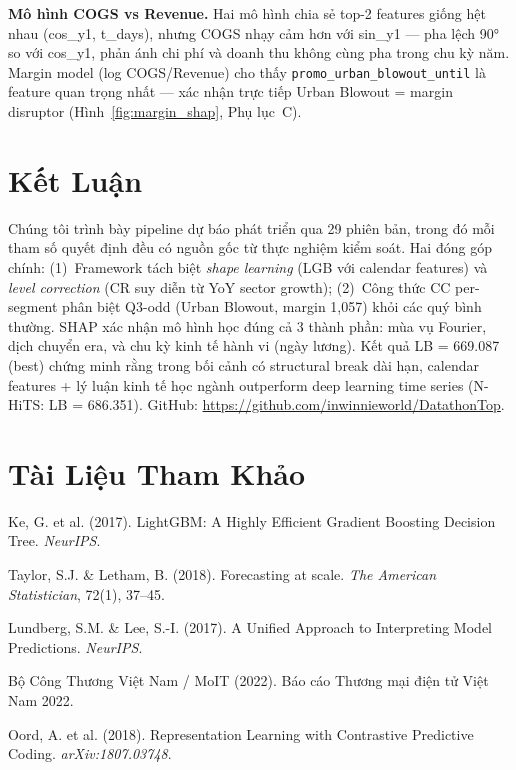 \documentclass{article}
\begin{document}
\textbf{Mô hình COGS vs Revenue.} Hai mô hình chia sẻ top-2 features giống hệt nhau (cos\_y1, t\_days), nhưng COGS nhạy cảm hơn với sin\_y1 — pha lệch 90° so với cos\_y1, phản ánh chi phí và doanh thu không cùng pha trong chu kỳ năm. Margin model (log COGS/Revenue) cho thấy \texttt{promo\_urban\_blowout\_until} là feature quan trọng nhất — xác nhận trực tiếp Urban Blowout = margin disruptor (Hình~\ref{fig:margin_shap}, Phụ lục~C).

\section{Kết Luận}

Chúng tôi trình bày pipeline dự báo phát triển qua 29 phiên bản, trong đó mỗi tham số quyết định đều có nguồn gốc từ thực nghiệm kiểm soát. Hai đóng góp chính: (1)~Framework tách biệt \textit{shape learning} (LGB với calendar features) và \textit{level correction} (CR suy diễn từ YoY sector growth); (2)~Công thức CC per-segment phân biệt Q3-odd (Urban Blowout, margin 1,057) khỏi các quý bình thường. SHAP xác nhận mô hình học đúng cả 3 thành phần: mùa vụ Fourier, dịch chuyển era, và chu kỳ kinh tế hành vi (ngày lương). Kết quả LB = 669.087 (best) chứng minh rằng trong bối cảnh có structural break dài hạn, calendar features + lý luận kinh tế học ngành outperform deep learning time series (N-HiTS: LB = 686.351). GitHub: \url{https://github.com/inwinnieworld/DatathonTop}.

\section*{Tài Liệu Tham Khảo}
\small
\begin{enumerate}[label={[\arabic*]},leftmargin=*]
  \item Ke, G. et al. (2017). LightGBM: A Highly Efficient Gradient Boosting Decision Tree. \textit{NeurIPS}.
  \item Taylor, S.J. \& Letham, B. (2018). Forecasting at scale. \textit{The American Statistician}, 72(1), 37–45.
  \item Lundberg, S.M. \& Lee, S.-I. (2017). A Unified Approach to Interpreting Model Predictions. \textit{NeurIPS}.
  \item Bộ Công Thương Việt Nam / MoIT (2022). Báo cáo Thương mại điện tử Việt Nam 2022.
  \item Oord, A. et al. (2018). Representation Learning with Contrastive Predictive Coding. \textit{arXiv:1807.03748}.
\end{enumerate}
\end{document}
